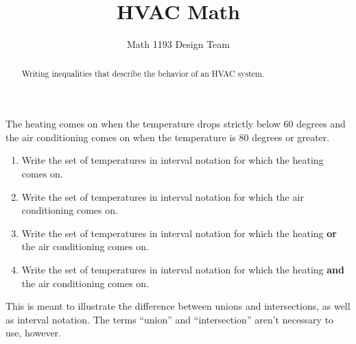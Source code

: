 \documentclass[noauthor]{ximera}
\title{HVAC Math}
\author{Math 1193 Design Team}
\begin{document}
\begin{abstract}
    Writing inequalities that describe the behavior of an HVAC system.
\end{abstract}
\maketitle

The heating comes on when the temperature drops strictly below 60 
degrees and the air conditioning comes on when the temperature is 80 
degrees or greater. 

\begin{enumerate}
    \item Write the set of temperatures in interval notation for which
    the heating comes on.
    \item Write the set of temperatures in interval notation for which
    the air conditioning comes on.
    \item Write the set of temperatures in interval notation for which
    the heating \textbf{or} the air conditioning comes on.
    \item Write the set of temperatures in interval notation for which
    the heating \textbf{and} the air conditioning comes on.
\end{enumerate}

\begin{instructorNotes}
This is meant to illustrate the difference between unions and intersections,
as well as interval notation. The terms ``union'' and ``intersection''
aren't necessary to use, however.
\end{instructorNotes}
\end{document}
